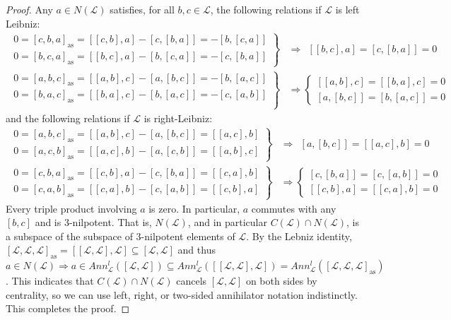 \documentclass[12pt]{article}
\begin{document}
\begin{proof}
				Any $a\in N(\mathcal{L})$ satisfies, for all $b,c\in\mathcal{L}$, the following relations if $\mathcal{L}$ is left Leibniz:
				\begin{align*}
					\left.\begin{array}{c}
						0=[c,b,a]_{\mathrm{as}}=[[c,b],a]-[c,[b,a]]=-[b,[c,a]]  \\
						0=[b,c,a]_{\mathrm{as}}=[[b,c],a]-[b,[c,a]]=-[c,[b,a]]
					\end{array}\right\}&\Rightarrow\ \ [[b,c],a]=[c,[b,a]]=0\\
					\left.\begin{array}{c}
						0=[a,b,c]_{\mathrm{as}}=[[a,b],c]-[a,[b,c]]=-[b,[a,c]]  \\
						0=[b,a,c]_{\mathrm{as}}=[[b,a],c]-[b,[a,c]]=-[c,[a,b]]  \\
					\end{array}\right\}&\Rightarrow \left\{\begin{matrix}
						[[a,b],c]=[[b,a],c]=0\\
						[a,[b,c]]=[b,[a,c]]=0
					\end{matrix} \right.
				\end{align*}
				and the following relations if $\mathcal{L}$ is right-Leibniz:
				\begin{align*}
					\left.\begin{array}{c}
						0=[a,b,c]_{\mathrm{as}}=[[a,b],c]-[a,[b,c]]=[[a,c],b]  \\
						0=[a,c,b]_{\mathrm{as}}=[[a,c],b]-[a,[c,b]]=[[a,b],c]
					\end{array}\right\}&\Rightarrow\ \ [a,[b,c]]=[[a,c],b]=0\\
					\left.\begin{array}{c}
						0=[c,b,a]_{\mathrm{as}}=[[c,b],a]-[c,[b,a]]=[[c,a],b]  \\
						0=[c,a,b]_{\mathrm{as}}=[[c,a],b]-[c,[a,b]]=[[c,b],a]
					\end{array}\right\}&\Rightarrow \left\{\begin{matrix}
						[c,[b,a]]=[c,[a,b]]=0\\
						[[c,b],a]=[[c,a],b]=0
					\end{matrix} \right.
				\end{align*}
				Every triple product involving $a$ is zero. In particular, $a$ commutes with any $[b,c]$ and is 3-nilpotent. That is, $N(\mathcal{L})$, and in particular $C(\mathcal{L})\cap N(\mathcal{L})$, is a subspace of the subspace of 3-nilpotent elements of $\mathcal{L}$. By the Lebniz identity,
				$[\mathcal{L},\mathcal{L},\mathcal{L}]_{\mathrm{as}}=[[\mathcal{L},\mathcal{L}],\mathcal{L}]\subseteq [\mathcal{L},\mathcal{L}]$ and thus  $a\in N(\mathcal{L})\Rightarrow a\in Ann_\mathcal{L}^l([\mathcal{L},\mathcal{L}])\subseteq Ann_\mathcal{L}^l([[\mathcal{L},\mathcal{L}],\mathcal{L}])= Ann_\mathcal{L}^l([\mathcal{L},\mathcal{L},\mathcal{L}]_{\mathrm{as}})$. This indicates that $C(\mathcal{L})\cap N(\mathcal{L})$ cancels $[\mathcal{L},\mathcal{L}]$ on both sides by centrality, so we can use left, right, or two-sided annihilator notation indistinctly. This completes the proof.
			\end{proof}				
\end{document}

